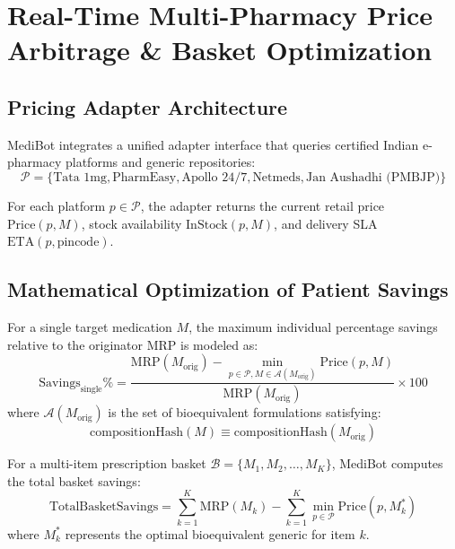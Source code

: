 \documentclass[11pt,a4paper]{article}
\begin{document}
\section{Real-Time Multi-Pharmacy Price Arbitrage \& Basket Optimization}

\subsection{Pricing Adapter Architecture}
MediBot integrates a unified adapter interface that queries certified Indian e-pharmacy platforms and generic repositories:
\begin{equation}
  \mathcal{P} = \{\text{Tata 1mg}, \text{PharmEasy}, \text{Apollo 24/7}, \text{Netmeds}, \text{Jan Aushadhi (PMBJP)}\}
\end{equation}

For each platform $p \in \mathcal{P}$, the adapter returns the current retail price $\text{Price}(p, M)$, stock availability $\text{InStock}(p, M)$, and delivery SLA $\text{ETA}(p, \text{pincode})$.

\subsection{Mathematical Optimization of Patient Savings}
For a single target medication $M$, the maximum individual percentage savings relative to the originator MRP is modeled as:
\begin{equation}
  \text{Savings}_{\text{single}}\% = \frac{\text{MRP}(M_{\text{orig}}) - \min_{p \in \mathcal{P}, M \in \mathcal{A}(M_{\text{orig}})} \text{Price}(p, M)}{\text{MRP}(M_{\text{orig}})} \times 100
\end{equation}
where $\mathcal{A}(M_{\text{orig}})$ is the set of bioequivalent formulations satisfying:
\begin{equation*}
  \text{compositionHash}(M) \equiv \text{compositionHash}(M_{\text{orig}})
\end{equation*}

For a multi-item prescription basket $\mathcal{B} = \{M_1, M_2, \dots, M_K\}$, MediBot computes the total basket savings:
\begin{equation}
  \text{TotalBasketSavings} = \sum_{k=1}^K \text{MRP}(M_k) - \sum_{k=1}^K \min_{p \in \mathcal{P}} \text{Price}(p, M_k^*)
\end{equation}
where $M_k^*$ represents the optimal bioequivalent generic for item $k$.
\end{document}

